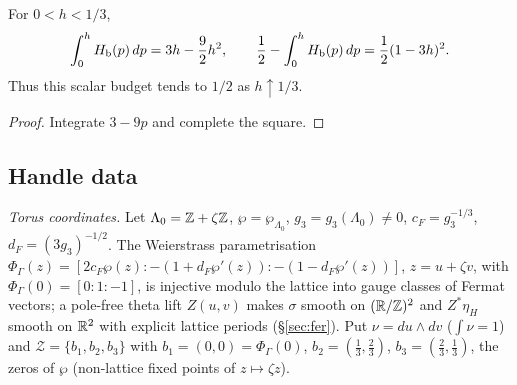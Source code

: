 \begin{lemma}\label{lem:cub-volume}
For $0<h<1/3$,
\[
 \int_0^hH_{\mathrm b}(p)\,dp=3h-\frac92h^2,\qquad
 \frac12-\int_0^hH_{\mathrm b}(p)\,dp=\frac12(1-3h)^2.
\]
Thus this scalar budget tends to $1/2$ as $h\uparrow1/3$.
\end{lemma}

\begin{proof}
Integrate $3-9p$ and complete the square.
\end{proof}

\subsection{Handle data}

\emph{Torus coordinates.} Let $\Lambda_0=\mathbb{Z}+\zeta\mathbb{Z}$, $\wp=\wp_{\Lambda_0}$, $g_3=g_3(\Lambda_0)\neq0$, $c_F=g_3^{-1/3}$, $d_F=(3g_3)^{-1/2}$. The Weierstrass parametrisation $\Phi_\Gamma(z)=[2c_F\wp(z):-(1+d_F\wp'(z)):-(1-d_F\wp'(z))]$, $z=u+\zeta v$, with $\Phi_\Gamma(0)=[0:1:-1]$, is injective modulo the lattice into gauge classes of Fermat vectors; a pole-free theta lift $Z(u,v)$ makes $\sigma$ smooth on $(\mathbb{R}/\mathbb{Z})^2$ and $Z^*\eta_H$ smooth on $\mathbb{R}^2$ with explicit lattice periods (\S\ref{sec:fer}). Put $\nu=du\wedge dv$ ($\int\nu=1$) and $\mathcal Z=\{b_1,b_2,b_3\}$ with $b_1=(0,0)=\Phi_\Gamma(0)$, $b_2=(\tfrac13,\tfrac23)$, $b_3=(\tfrac23,\tfrac13)$, the zeros of $\wp$ (non-lattice fixed points of $z\mapsto\zeta z$).

